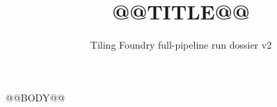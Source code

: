 \documentclass[10pt]{article}
\title{@@TITLE@@}
\author{Tiling Foundry full-pipeline run dossier v2}
\date{}
\begin{document}
\maketitle
@@BODY@@
\end{document}
